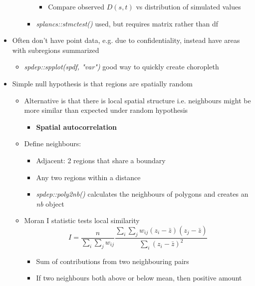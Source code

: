 \documentclass{article}
\begin{document}
\begin{itemize}
\begin{itemize}
\begin{itemize}
\begin{itemize}
                \item  Compare observed $D(s, t)$ vs distribution of simulated values
            \end{itemize}
            \item \textit{splancs::stmctest()} used, but requires matrix rather than df
        \end{itemize}
    \end{itemize}
    \item Often don't have point data, e.g. due to confidentiality, instead have areas with subregions summarized
    \begin{itemize}
        \item \textit{spdep::spplot(spdf, "var")} good way to quickly create choropleth
    \end{itemize}
    \item Simple null hypothesis is that regions are spatially random
    \begin{itemize}
        \item Alternative is that there is local spatial structure i.e. neighbours might be more similar than expected under random hypothesis
        \begin{itemize}
            \item \textbf{Spatial autocorrelation}
        \end{itemize}
        \item Define neighbours:
        \begin{itemize}
            \item Adjacent: 2 regions that share a boundary
            \item Any two regions within a distance
            \item \textit{spdep::poly2nb()} calculates the neighbours of polygons and creates an \textit{nb} object
        \end{itemize}
        \item Moran I statistic tests local similarity
        \begin{equation}
            I = \frac{n}{\sum_i \sum_j w_{ij}} \frac{\sum_i \sum_j w_{ij} (z_i - \bar{z})(z_j - \bar{z})}{\sum_i (z_i - \bar{z})^2}
        \end{equation}
        \begin{itemize}
            \item Sum of contributions from two neighbouring pairs
            \item If two neighbours both above or below mean, then positive amount

\end{itemize}
\end{itemize}
\end{itemize}
\end{document}

